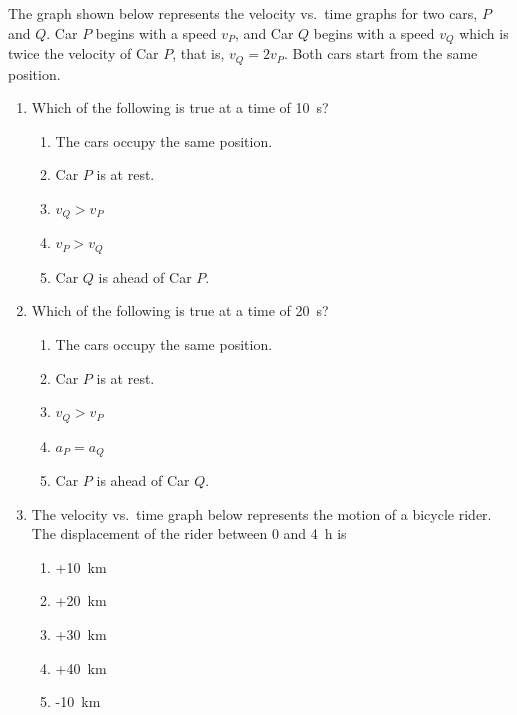 \documentclass{../../oss-apphys}
\begin{document}
\begin{multicols}{2}
  The graph shown below represents the velocity vs.\ time graphs for two cars,
  $P$ and $Q$. Car $P$ begins with a speed $v_P$, and Car $Q$ begins with a
  speed $v_Q$ which is twice the velocity of Car $P$, that is, $v_Q=2v_P$. Both
  cars start from the same position.
  \begin{center}
  \end{center}
  \begin{enumerate}[resume,leftmargin=18pt]
  \item Which of the following is true at a time of \SI{10}{\second}?
    \begin{enumerate}[noitemsep,topsep=0pt,leftmargin=18pt,label=(\Alph*)]
    \item The cars occupy the same position.
    \item Car $P$ is at rest.
    \item $v_Q>v_P$
    \item $v_P>v_Q$
    \item Car $Q$ is ahead of Car $P$.
    \end{enumerate}

  \item Which of the following is true at a time of \SI{20}{\second}?
    \begin{enumerate}[noitemsep,topsep=0pt,leftmargin=18pt,label=(\Alph*)]
    \item The cars occupy the same position.
    \item Car $P$ is at rest.
    \item $v_Q>v_P$
    \item $a_P=a_Q$
    \item Car $P$ is ahead of Car $Q$.
    \end{enumerate}
    
  \item The velocity vs.\ time graph below represents the motion of a bicycle
    rider. The displacement of the rider between $0$ and \SI{4}{\hour} is
    \begin{center}
    \end{center}
    \begin{enumerate}[noitemsep,topsep=0pt,leftmargin=18pt,label=(\Alph*)]
    \item +\SI{10}{\kilo\metre}
    \item +\SI{20}{\kilo\metre}
    \item +\SI{30}{\kilo\metre}
    \item +\SI{40}{\kilo\metre}
    \item -\SI{10}{\kilo\metre}
    \end{enumerate}
    \columnbreak
    

\end{enumerate}
\end{multicols}
\end{document}
